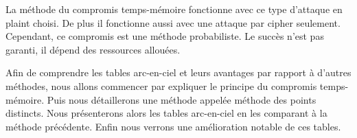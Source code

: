 	La méthode du compromis temps-mémoire fonctionne avec ce type d'attaque en \gls{plaint} choisi. De plus il fonctionne aussi avec une attaque par \gls{cipher} seulement. Cependant, ce compromis est une méthode probabiliste. Le succès n'est pas garanti, il dépend des ressources allouées.

	Afin de comprendre les tables arc-en-ciel et leurs avantages par rapport à d'autres méthodes, nous allons commencer par expliquer le principe du compromis temps-mémoire. Puis nous détaillerons une méthode appelée méthode des points distincts. Nous présenterons alors les tables arc-en-ciel en les comparant à la méthode précédente. Enfin nous verrons une amélioration notable de ces tables.

\endinput{}
